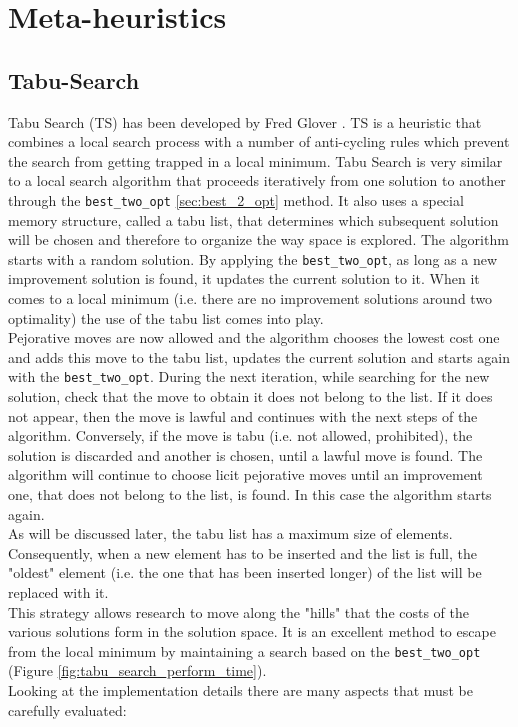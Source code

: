 \chapter{Meta-heuristics}

\section{Tabu-Search}
Tabu Search (TS) has been developed by Fred Glover \cite{Glover1998}. TS is a heuristic that combines a local search process with a number of anti-cycling rules which prevent the search from getting trapped in a local minimum. Tabu Search is very similar to a local search algorithm that proceeds iteratively from one solution to another through the \texttt{best\_two\_opt} \ref{sec:best_2_opt} method. It also uses a special memory structure, called a tabu list, that determines which subsequent solution will be chosen and therefore to organize the way space is explored. The algorithm starts with a random solution. By applying the \texttt{best\_two\_opt}, as long as a new improvement solution is found, it updates the current solution to it. When it comes to a local minimum (i.e. there are no improvement solutions around two optimality) the use of the tabu list comes into play.\\
Pejorative moves are now allowed and the algorithm chooses the lowest cost one and adds this move to the tabu list, updates the current solution and starts again with the \texttt{best\_two\_opt}.
During the next iteration, while searching for the new solution, check that the move to obtain it does not belong to the list. If it does not appear, then the move is lawful and continues with the next steps of the algorithm. Conversely, if the move is tabu (i.e. not allowed, prohibited), the solution is discarded and another is chosen, until a lawful move is found. The algorithm will continue to choose licit pejorative moves until an improvement one, that does not belong to the list, is found. In this case the algorithm starts again.\\
As will be discussed later, the tabu list has a maximum size of elements. Consequently, when a new element has to be inserted and the list is full, the "oldest" element (i.e. the one that has been inserted longer) of the list will be replaced with it.\\
This strategy allows research to move along the "hills" that the costs of the various solutions form in the solution space. It is an excellent method to escape from the local minimum by maintaining a search based on the \texttt{best\_two\_opt} (Figure \ref{fig:tabu_search_perform_time}).\\
Looking at the implementation details there are many aspects that must be carefully evaluated:

